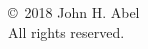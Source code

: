 \chapter*{}
\null
\thispagestyle{empty}
\vfill
\begin{center}
  \copyright \ 2018 John H. Abel\\
  All rights reserved.
\end{center}

